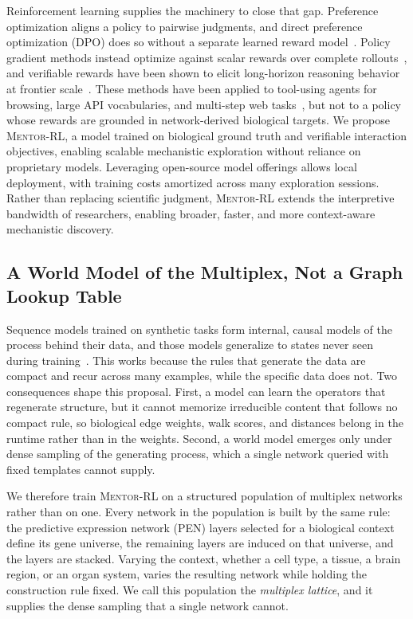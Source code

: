 \documentclass[thesis,letterpaper,12pt]{utthesis}
\begin{document}
Reinforcement learning supplies the machinery to close that gap. Preference optimization aligns a policy to pairwise judgments, and direct preference optimization (DPO) does so without a separate learned reward model~\cite{christiano2017rlhf, ouyang2022instructgpt, dpo}. Policy gradient methods instead optimize against scalar rewards over complete rollouts~\cite{schulman2017proximal, shao2024deepseekmath}, and verifiable rewards have been shown to elicit long-horizon reasoning behavior at frontier scale~\cite{guo2025deepseek}. These methods have been applied to tool-using agents for browsing, large API vocabularies, and multi-step web tasks~\cite{nakano2021webgpt, qin2023toolllm, putta2024agent}, but not to a policy whose rewards are grounded in network-derived biological targets. We propose \textsc{Mentor-RL}, a model trained on biological ground truth and verifiable interaction objectives, enabling scalable mechanistic exploration without reliance on proprietary models. Leveraging open-source model offerings allows local deployment, with training costs amortized across many exploration sessions. Rather than replacing scientific judgment, \textsc{Mentor-RL} extends the interpretive bandwidth of researchers, enabling broader, faster, and more context-aware mechanistic discovery.

\subsection{A World Model of the Multiplex, Not a Graph Lookup Table}
Sequence models trained on synthetic tasks form internal, causal models of the process behind their data, and those models generalize to states never seen during training~\cite{li2023othello}. This works because the rules that generate the data are compact and recur across many examples, while the specific data does not. Two consequences shape this proposal. First, a model can learn the operators that regenerate structure, but it cannot memorize irreducible content that follows no compact rule, so biological edge weights, walk scores, and distances belong in the runtime rather than in the weights. Second, a world model emerges only under dense sampling of the generating process, which a single network queried with fixed templates cannot supply.

We therefore train \textsc{Mentor-RL} on a structured population of multiplex networks rather than on one. Every network in the population is built by the same rule: the predictive expression network (PEN) layers selected for a biological context define its gene universe, the remaining layers are induced on that universe, and the layers are stacked. Varying the context, whether a cell type, a tissue, a brain region, or an organ system, varies the resulting network while holding the construction rule fixed. We call this population the \textit{multiplex lattice}, and it supplies the dense sampling that a single network cannot.
\end{document}
